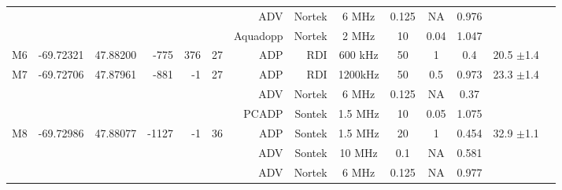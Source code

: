 \documentclass[letterpaper,10pt,landscape]{article}
\begin{document}
\begin{table}
\begin{tabular}{|r|c|c|r|r|r|r|r|c|c|c|c|c|c|}
    ~                   &                            &                           &                        &                      &                     & ADV          & Nortek     & 6 MHz     & 0.125     & NA       & 0.976      &                                    \\ %
    ~                   &                            &                           &                        &                      &                     & Aquadopp     & Nortek     & 2 MHz     & 10        & 0.04     & 1.047      &                                    \\\hline
    M6                  & -69.72321                  & 47.88200                  & -775                   & 376                  & 27                  & ADP          & RDI        & 600 kHz   & 50        & 1        & 0.4        &  20.5 $\pm$1.4                     \\\hline
    \multirow{3}{*}{M7} & \multirow{3}{*}{-69.72706} & \multirow{3}{*}{47.87961} & \multirow{3}{*}{-881}  & \multirow{3}{*}{-1}  & \multirow{3}{*}{27} & ADP          & RDI        & 1200kHz   & 50        & 0.5      & 0.973      &  \multirow{3}{*}{23.3 $\pm$1.4}    \\ 
    ~                   &                            &                           &                        &                      &                     & ADV          & Nortek     & 6 MHz     & 0.125     & NA       & 0.37       &                                    \\ %
    ~                   &                            &                           &                        &                      &                     & PCADP        & Sontek     & 1.5 MHz   & 10        & 0.05     & 1.075      &                                    \\\hline
    \multirow{4}{*}{M8} & \multirow{4}{*}{-69.72986} & \multirow{4}{*}{47.88077} & \multirow{4}{*}{-1127} & \multirow{4}{*}{-1}  & \multirow{4}{*}{36} & ADP          & Sontek     & 1.5 MHz   & 20        & 1        & 0.454      &  \multirow{4}{*}{32.9 $\pm$1.1}    \\ 
    ~                   &                            &                           &                        &                      &                     & ADV          & Sontek     & 10 MHz    & 0.1       & NA       & 0.581      &                                    \\ 
    ~                   &                            &                           &                        &                      &                     & ADV          & Nortek     & 6 MHz     & 0.125     & NA       & 0.977      &                                    \\ %

\end{tabular}
\end{table}
\end{document}
